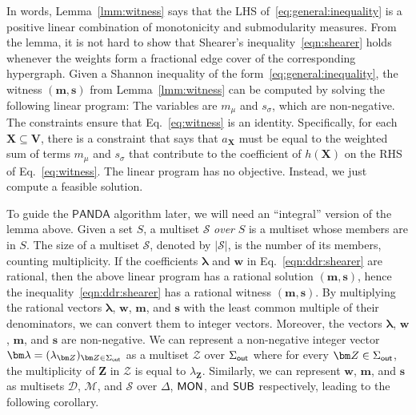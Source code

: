 \documentclass[10pt,a4paper]{article}
\newcommand{\calM}{\mathcal M}
\newcommand{\calS}{\mathcal S}
\newcommand{\calD}{\mathcal D}
\newcommand{\calZ}{\mathcal Z}
\newcommand{\out}{\text{\sf out}}
\newcommand{\mon}{\text{\sf MON}}
\newcommand{\sub}{\text{\sf SUB}}
\newcommand{\panda}{\textsf{PANDA}\xspace}
\begin{document}
%
In words, Lemma~\ref{lmm:witness} says that the LHS of~\eqref{eq:general:inequality} is a
positive linear combination of monotonicity and submodularity measures. From the lemma, it is
not hard to show that Shearer's inequality~\eqref{eqn:shearer} holds whenever the weights
form a fractional edge cover of the corresponding hypergraph.
Given a Shannon inequality of the form~\eqref{eq:general:inequality},
the witness $(\bm m, \bm s)$
from Lemma~\ref{lmm:witness} can be computed by solving the following linear program:
The variables are $m_\mu$ and $s_\sigma$, which are non-negative.
The constraints ensure that Eq.~\eqref{eq:witness} is an identity.
Specifically, for each $\bm X \subseteq \bm V$, there is a constraint
that says that $a_{\bm X}$ must be equal to the weighted sum of terms $m_\mu$ and $s_\sigma$ that contribute to the coefficient of $h(\bm X)$ on the RHS of Eq.~\eqref{eq:witness}.
The linear program has no objective. Instead, we just compute a feasible solution.


To guide the $\panda$ algorithm later, we will need an ``integral'' version of the lemma above.
Given a set $S$, a multiset $\calS$ {\em over} $S$ is a multiset whose members are in $S$. The
size of a multiset $\calS$, denoted by $|\calS|$, is the number of its members, counting
multiplicity.
If the coefficients $\bm \lambda$ and $\bm w$ in Eq.~\eqref{eqn:ddr:shearer} are rational, then the above linear program has a rational solution
$(\bm m, \bm s)$, hence
the inequality~\eqref{eqn:ddr:shearer} has a rational witness $(\bm m, \bm s)$.
By multiplying the rational vectors $\bm \lambda$, $\bm w$, $\bm m$, and $\bm s$
with
the least common multiple of their denominators, we can convert
them to integer vectors.
Moreover, the vectors $\bm \lambda$, $\bm w$, $\bm m$, and $\bm s$ are non-negative.
We can represent a non-negative integer vector $\bm \lambda = (\lambda_{\bm Z})_{\bm Z \in\Sigma_{\out}}$ as a multiset $\calZ$ over $\Sigma_\out$
where for every $\bm Z \in\Sigma_{\out}$, the multiplicity of $\bm Z$ in $\calZ$ is equal to
$\lambda_{\bm Z}$. Similarly, we can represent $\bm w$, $\bm m$, and $\bm s$ as multisets $\calD$, $\calM$, and $\calS$ over $\Delta$, $\mon$, and $\sub$ respectively, leading to the following corollary.
\end{document}
